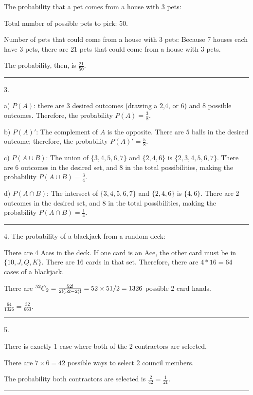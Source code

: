 \documentclass{article}
\begin{document}
The probability that a pet comes from a house with 3 pets:

Total number of possible pets to pick: 50. 

Number of pets that could come from a house with 3 pets: Because 7 houses each have 3 pets, there are 21 pets that could come from a house with 3 pets. 

The probability, then, is $\boxed{{\frac{21}{50}}}$. %

\noindent\rule{8cm}{0.4pt}

3. 

a) $P(A)$: there are 3 desired outcomes (drawing a 2,4, or 6) and 8 possible outcomes. Therefore, the probability $P(A)= \frac{3}{8}$. 

b) $P(A)'$: The complement of $A$ is the opposite. There are $5$ balls in the desired outcome; therefore, the  probability $P(A)'= \boxed{\frac{5}{8}}$. 

c) $P(A\cup B)$: The union of $\{3,4,5,6,7\}$ and $\{2,4,6\}$ is $\{2,3,4,5,6,7\}$. There are 6 outcomes in the desired set, and 8 in the total possibilities, making the probability $P(A\cup B)= \boxed{\frac{3}{4}}$. 

d) $P(A \cap B)$: The intersect of $\{3,4,5,6,7\}$ and $\{2,4,6\}$ is $\{4,6\}$. There are 2 outcomes in the desired set, and 8 in the total possibilities, making the probability $P(A\cap B)= \boxed{\frac{1}{4}}$. 

\noindent\rule{8cm}{0.4pt}

4. The probability of a blackjack from a random deck: 

There are 4 Aces in the deck. If one card is an Ace, the other card must be in $\{10, J, Q, K\}$. There are 16 cards in that set. Therefore, there are $4 * 16 = 64$ cases of a blackjack. 

There are ${}^{52}C_{2}=\frac{52!}{2!(52-2)!} =52 \times 51 / 2  = 1326$ possible 2 card hands. 

$\frac{64}{1326} = \boxed{\frac{32	}{663}}$. 

\noindent\rule{8cm}{0.4pt}


5. 

There is exactly 1 case where both of the 2 contractors are selected. 

There are $7 \times 6 = 42$ possible ways to select 2 council members. 

The probability both contractors are selected is $\frac{2}{42} = \boxed{\frac{1}{21}}$. 

\noindent\rule{8cm}{0.4pt}
\end{document}
